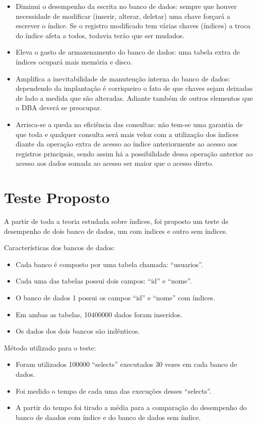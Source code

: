 \documentclass[12pt,a4paper]{article}
\begin{document}
\begin{itemize}
	\item Diminui o desempenho da escrita no banco de dados: sempre que houver necessidade de modificar (inserir, alterar, deletar) uma chave forçará a escrever o índice. Se o registro modificado tem várias chaves (índices) a troca do índice afeta a todos, todavia terão que ser mudados.
	
	\item Eleva o gasto de armazenamento do banco de dados: uma tabela extra de índices ocupará mais memória e disco.
	
	\item Amplifica a inevitabilidade de manutenção interna do banco de dados: dependendo da implantação é corriqueiro o fato de que chaves sejam deixadas de lado a medida que são alteradas. Adiante também de outros elementos que o DBA deverá se preocupar.
	
	\item	Arrisca-se a queda na eficiência das consultas: não tem-se uma garantia de que toda e qualquer consulta será mais veloz com a utilização dos índices diante da operação extra de acesso ao índice anteriormente ao acesso aos registros principais, sendo assim há a possibilidade dessa operação anterior ao acesso aos dados somada ao acesso ser maior que o acesso direto.
	
\end{itemize}

\section{Teste Proposto}
	A partir de toda a teoria estudada sobre índices, foi proposto um teste de desempenho de dois banco de dados, um com índices e outro sem índices.
	
	Características dos bancos de dados:
	\begin{itemize}
		\item Cada banco é composto por uma tabela chamada: “usuarios”.
		\item Cada uma das tabelas possui dois campos: “id” e “nome”.
		\item O banco de dados 1 possui os campos “id” e “nome” com índices.
		\item Em ambas as tabelas, 10400000 dados foram inseridos.
		\item Os dados dos dois bancos são indênticos.
	\end{itemize}
	Método utilizado para o teste:
	\begin{itemize}
		\item Foram utilizados 100000 “selects” executados 30 vezes em cada banco de dados.
		\item Foi medido o tempo de cada uma das execuções desses “selects”.
		\item A partir do tempo foi tirado a média para a comparação do desempenho do banco de daados com índice e do banco de dados sem índice.
	\end{itemize}
\end{document}
